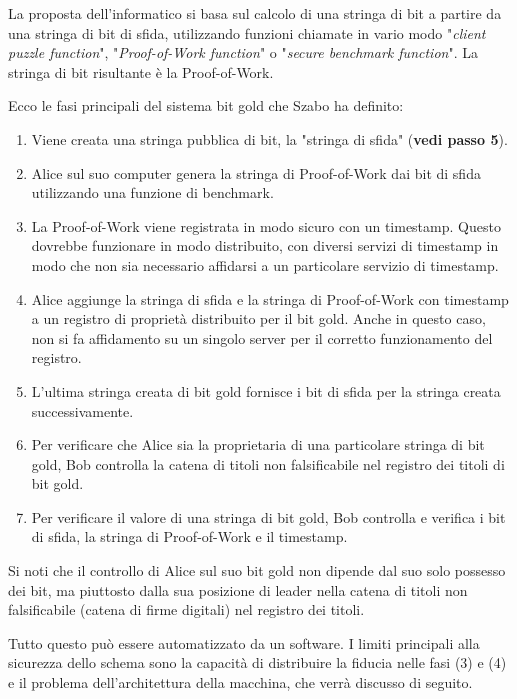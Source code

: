 La proposta dell'informatico si basa sul calcolo di una stringa di bit a partire da una stringa di bit di sfida, utilizzando funzioni chiamate in vario modo "\textit{client puzzle function}", "\textit{Proof-of-Work function}" o "\textit{secure benchmark function}". La stringa di bit risultante è la Proof-of-Work.

Ecco le fasi principali del sistema bit gold che Szabo ha definito:

\begin{enumerate}
  \item Viene creata una stringa pubblica di bit, la "stringa di sfida" (\textbf{vedi passo 5}).
  \item Alice sul suo computer genera la stringa di Proof-of-Work dai bit di sfida utilizzando una funzione di benchmark.
  \item La Proof-of-Work viene registrata in modo sicuro con un timestamp. Questo dovrebbe funzionare in modo distribuito, con diversi servizi di timestamp in modo che non sia necessario affidarsi a un particolare servizio di timestamp.
  \item Alice aggiunge la stringa di sfida e la stringa di Proof-of-Work con timestamp a un registro di proprietà distribuito per il bit gold. Anche in questo caso, non si fa affidamento su un singolo server per il corretto funzionamento del registro.
  \item L'ultima stringa creata di bit gold fornisce i bit di sfida per la stringa creata successivamente.
  \item Per verificare che Alice sia la proprietaria di una particolare stringa di bit gold, Bob controlla la catena di titoli non falsificabile nel registro dei titoli di bit gold.
  \item Per verificare il valore di una stringa di bit gold, Bob controlla e verifica i bit di sfida, la stringa di Proof-of-Work e il timestamp.
\end{enumerate}

Si noti che il controllo di Alice sul suo bit gold non dipende dal suo solo possesso dei bit, ma piuttosto dalla sua posizione di leader nella catena di titoli non falsificabile (catena di firme digitali) nel registro dei titoli.

Tutto questo può essere automatizzato da un software. I limiti principali alla sicurezza dello schema sono la capacità di distribuire la fiducia nelle fasi (3) e (4) e il problema dell'architettura della macchina, che verrà discusso di seguito.

